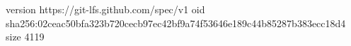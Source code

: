 version https://git-lfs.github.com/spec/v1
oid sha256:02ceac50bfa323b720cecb97ec42bf9a74f53646e189c44b85287b383ecc18d4
size 4119
